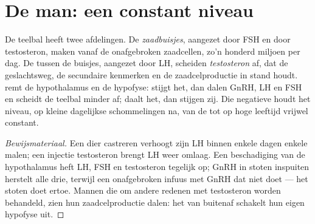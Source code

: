 \section{De man: een constant niveau}

\begin{proposition}\label{prop:g11:hormones-and-reproduction:male}
De teelbal heeft twee afdelingen. De \emph{zaadbuisjes}, aangezet door
FSH en door testosteron, maken vanaf de  onafgebroken
zaadcellen, zo'n honderd miljoen per dag. De  tussen de buisjes,
aangezet door LH, scheiden \emph{testosteron} af, dat de geslachtsweg, de
secundaire kenmerken en de zaadcelproductie in stand houdt. 
remt de hypothalamus en de hypofyse: stijgt het, dan dalen GnRH, LH en
FSH en scheidt de teelbal minder af; daalt het, dan stijgen zij. Die
negatieve  houdt het niveau, op kleine dagelijkse
schommelingen na, van de  tot op hoge leeftijd vrijwel constant.
\end{proposition}
\begin{proof}[Bewijsmateriaal]
Een dier castreren verhoogt zijn LH binnen enkele dagen enkele malen; een
injectie testosteron brengt LH weer omlaag. Een beschadiging van de
hypothalamus heft LH, FSH en testosteron tegelijk op; GnRH in stoten
inspuiten herstelt alle drie, terwijl een onafgebroken infuus met GnRH dat
niet doet --- het stoten doet ertoe. Mannen die om andere redenen met
testosteron worden behandeld, zien hun zaadcelproductie dalen: het 
van buitenaf schakelt hun eigen hypofyse uit.
\end{proof}

